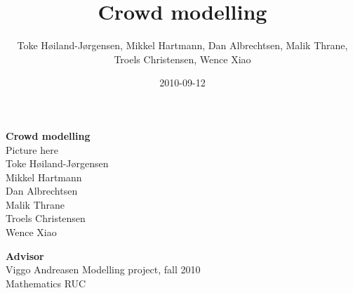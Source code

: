 \documentclass[a4paper,11pt]{scrartcl}
\title{Crowd modelling}
\author{Toke Høiland-Jørgensen, Mikkel Hartmann, Dan Albrechtsen, Malik 
Thrane, Troels Christensen, Wence Xiao}
\date{2010-09-12}
\begin{document}
\begin{titlepage}
    \begin{center}
        {\Huge \sffamily \textbf{Crowd modelling\\[2cm]
        }} Picture here %
        \\[2cm]

        {\large Toke Høiland-Jørgensen \\
        Mikkel Hartmann\\
        Dan Albrechtsen\\
        Malik Thrane\\
        Troels Christensen\\
        Wence Xiao\\
        [0.5cm] }

        {\small \textbf{\textsf{Advisor}}\\
        Viggo Andreasen}
        \vfill
        \textsf{Modelling project, fall 2010\\
        Mathematics RUC}
	\end{center}

    \clearpage
%    
\end{titlepage}

\tableofcontents
\listoffigures

\clearpage


\clearpage

\clearpage

\clearpage

\clearpage

\clearpage

\clearpage

\clearpage

\clearpage

\clearpage


\clearpage
\end{document}
